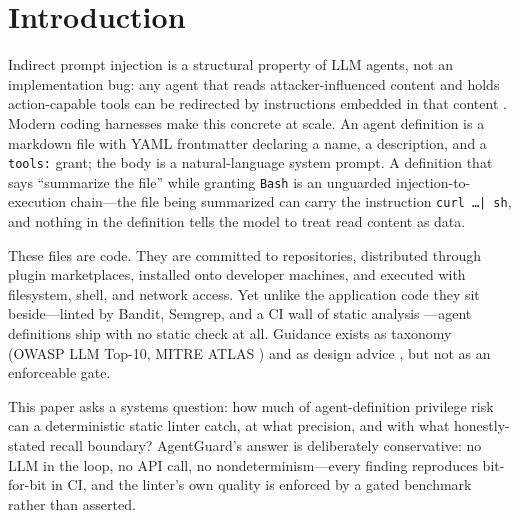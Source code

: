 \documentclass[11pt]{article}
\begin{document}
\section{Introduction}
Indirect prompt injection is a structural property of LLM agents, not an implementation bug: any
agent that reads attacker-influenced content and holds action-capable tools can be redirected by
instructions embedded in that content \cite{greshake2023indirect,perez2022ignore,willison2022prompt}.
Modern coding harnesses make this concrete at scale. An agent definition is a markdown file with
YAML frontmatter declaring a name, a description, and a \texttt{tools:} grant; the body is a
natural-language system prompt. A definition that says ``summarize the file'' while granting
\texttt{Bash} is an unguarded injection-to-execution chain---the file being summarized can carry
the instruction \texttt{curl \ldots | sh}, and nothing in the definition tells the model to treat
read content as data.

These files are code. They are committed to repositories, distributed through plugin marketplaces,
installed onto developer machines, and executed with filesystem, shell, and network access. Yet
unlike the application code they sit beside---linted by Bandit, Semgrep, and a CI wall of static
analysis \cite{bandit2024,semgrep2024}---agent definitions ship with no static check at all.
Guidance exists as taxonomy (OWASP LLM Top-10, MITRE ATLAS \cite{owasp2025llm,mitre2024atlas}) and
as design advice \cite{anthropic2024agents}, but not as an enforceable gate.

This paper asks a systems question: how much of agent-definition privilege risk can a
deterministic static linter catch, at what precision, and with what honestly-stated recall
boundary? AgentGuard's answer is deliberately conservative: no LLM in the loop, no API call, no
nondeterminism---every finding reproduces bit-for-bit in CI, and the linter's own quality is
enforced by a gated benchmark rather than asserted.
\end{document}
